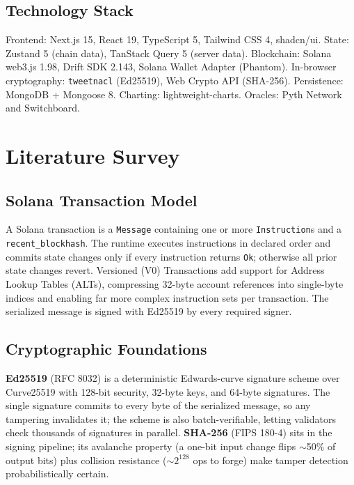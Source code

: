 \documentclass[11pt,a4paper]{article}
\begin{document}
\subsection{Technology Stack}

Frontend: Next.js 15, React 19, TypeScript 5, Tailwind CSS 4, shadcn/ui. State: Zustand 5 (chain data), TanStack Query 5 (server data). Blockchain: Solana web3.js 1.98, Drift SDK 2.143, Solana Wallet Adapter (Phantom). In-browser cryptography: \texttt{tweetnacl} (Ed25519), Web Crypto API (SHA-256). Persistence: MongoDB + Mongoose 8. Charting: lightweight-charts. Oracles: Pyth Network and Switchboard.

\section{Literature Survey}

\subsection{Solana Transaction Model}

A Solana transaction is a \texttt{Message} containing one or more \texttt{Instruction}s and a \texttt{recent\_blockhash}. The runtime executes instructions in declared order and commits state changes only if every instruction returns \texttt{Ok}; otherwise all prior state changes revert. Versioned (V0) Transactions add support for Address Lookup Tables (ALTs), compressing 32-byte account references into single-byte indices and enabling far more complex instruction sets per transaction. The serialized message is signed with Ed25519 by every required signer.

\subsection{Cryptographic Foundations}

\textbf{Ed25519} (RFC 8032) is a deterministic Edwards-curve signature scheme over Curve25519 with 128-bit security, 32-byte keys, and 64-byte signatures. The single signature commits to every byte of the serialized message, so any tampering invalidates it; the scheme is also batch-verifiable, letting validators check thousands of signatures in parallel. \textbf{SHA-256} (FIPS 180-4) sits in the signing pipeline; its avalanche property (a one-bit input change flips $\sim$50\% of output bits) plus collision resistance ($\sim 2^{128}$ ops to forge) make tamper detection probabilistically certain.
\end{document}
